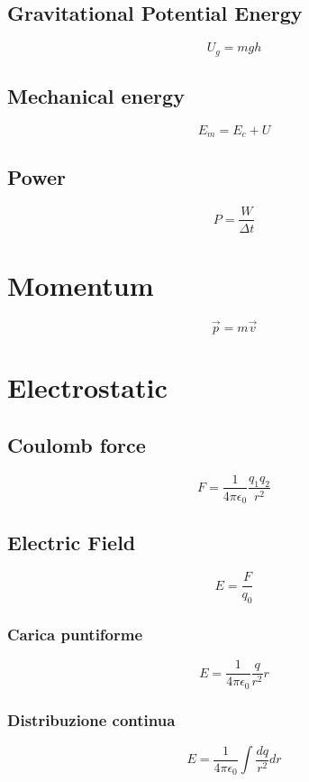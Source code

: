 \documentclass[Master.tex]{subfiles}
\begin{document}
\begin{multicols}{2}
		  \subsection{Gravitational Potential Energy}
				   \[
						    U_{g} = mgh
				   \]

		  \subsection{Mechanical energy}
				   \[
						    E_{m} = E_{c} + U
				   \]
		  \subsection{Power}
				   \[
						    P = \frac{W}{\Delta t}
				   \]

		 \section{Momentum}
		  \[
				   \vec{p} = m \vec{v}
		  \]

		 \section{Electrostatic}

		  \subsection{Coulomb force}
				   \[
						    F = \frac{1}{4 \pi  \epsilon_{0} }\frac{q_{1}q_2 }{r^2}
				   \]

		  \subsection{Electric Field}
				   \[
						    E = \frac{F}{q_{0} }
				   \]

				   \subsubsection{Carica puntiforme}

						    \[
								     E = \frac{1}{4 \pi \epsilon_{0}  } \frac{q}{r^{2} } r
						    \]

				   \subsubsection{Distribuzione continua}
						    \[
								     E = \frac{1}{4 \pi  \epsilon_{0} } \int \frac{dq}{r^2} dr
						    \]


\end{multicols}
\end{document}

